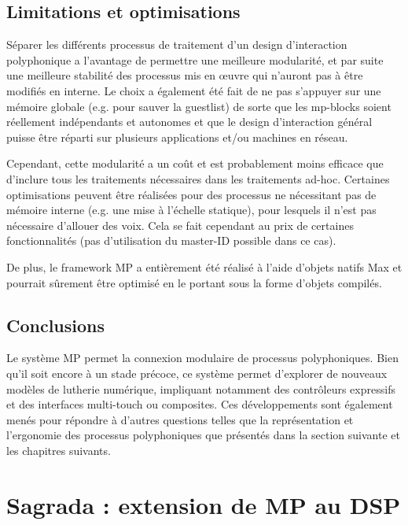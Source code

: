 \subsection{Limitations et optimisations}
Séparer les différents processus de traitement d'un design d'interaction polyphonique a l'avantage de permettre une meilleure modularité, et par suite une meilleure stabilité des processus mis en œuvre qui n'auront pas à être modifiés en interne. Le choix a également été fait de ne pas s'appuyer sur une mémoire globale (e.g. pour sauver la guestlist) de sorte que les mp-blocks soient réellement indépendants et autonomes et que le design d'interaction général puisse être réparti sur plusieurs applications et/ou machines en réseau.

Cependant, cette modularité a un coût et est probablement moins efficace que d'inclure tous les traitements nécessaires dans les traitements ad-hoc. Certaines optimisations peuvent être réalisées pour des processus ne nécessitant pas de mémoire interne (e.g. une mise à l'échelle statique), pour lesquels il n'est pas nécessaire d'allouer des voix. Cela se fait cependant au prix de certaines fonctionnalités (pas d'utilisation du master-ID possible dans ce cas).

De plus, le framework MP a entièrement été réalisé à l'aide d'objets natifs Max et pourrait sûrement être optimisé en le portant sous la forme d'objets compilés.

\subsection{Conclusions}
Le système MP permet la connexion modulaire de processus polyphoniques. Bien qu'il soit encore à un stade précoce, ce système permet d'explorer de nouveaux modèles de lutherie numérique, impliquant notamment des contrôleurs expressifs et des interfaces multi-touch ou composites.
Ces développements sont également menés pour répondre à d'autres questions telles que la représentation et l'ergonomie des processus polyphoniques que présentés dans la section suivante et les chapitres suivants.

\section{Sagrada : extension de MP au DSP}
\label{sec:algorithms:sagrada}

